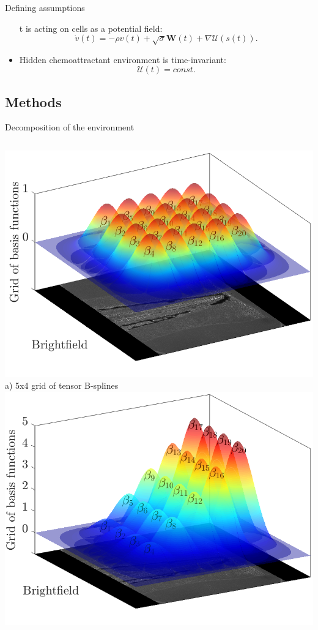 \documentclass[mathserif,11pt]{beamer}
\begin{document}
\begin{frame}{Defining assumptions}
\begin{itemize}
t is acting on cells as a potential field:
	\begin{equation*}
	\dot{v}(t) = - \rho v(t) + \sqrt{\sigma}\mathbf{W}(t) + \nabla\mathcal{U}(s(t)).
	\end{equation*}
	\item Hidden chemoattractant environment is time-invariant:
	\begin{equation*}
	\mathcal{U}(t) = const.
	\end{equation*}
\end{itemize}
\end{frame}
\subsection{Methods}
\begin{frame}{Decomposition of the environment}
\begin{columns}
\begin{column}{0.4\textwidth}
	\centering
	\includegraphics[scale=0.2]{Figures/grid.png}\\
	\footnotesize{a) 5x4 grid of tensor B-splines}
	\hfil
	\includegraphics[scale=0.2]{Figures/grid2.png}\\

\end{column}
\end{columns}
\end{frame}
\end{document}
